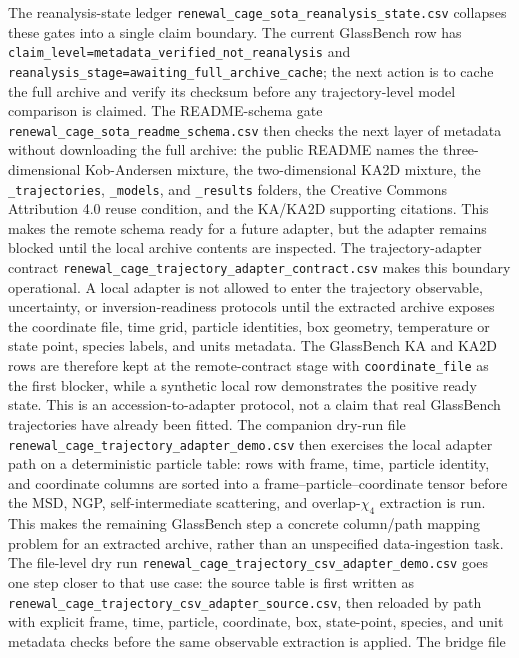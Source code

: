 \documentclass[aps,preprint,onecolumn,superscriptaddress,nofootinbib]{revtex4-2}
\begin{document}
The reanalysis-state ledger
\texttt{renewal\_cage\_sota\_reanalysis\_state.csv} collapses these gates into
a single claim boundary. The current GlassBench row has
\texttt{claim\_level=metadata\_verified\_not\_reanalysis} and
\texttt{reanalysis\_stage=awaiting\_full\_archive\_cache}; the next action is
to cache the full archive and verify its checksum before any trajectory-level
model comparison is claimed.
The README-schema gate
\texttt{renewal\_cage\_sota\_readme\_schema.csv} then checks the next layer of
metadata without downloading the full archive: the public README names the
three-dimensional Kob-Andersen mixture, the two-dimensional KA2D mixture, the
\texttt{\_trajectories}, \texttt{\_models}, and \texttt{\_results} folders,
the Creative Commons Attribution 4.0 reuse condition, and the KA/KA2D
supporting citations. This makes the remote schema ready for a future adapter,
but the adapter remains blocked until the local archive contents are inspected.
The trajectory-adapter contract
\texttt{renewal\_cage\_trajectory\_adapter\_contract.csv} makes this boundary
operational. A local adapter is not allowed to enter the trajectory observable,
uncertainty, or inversion-readiness protocols until the extracted archive
exposes the coordinate file, time grid, particle identities, box geometry,
temperature or state point, species labels, and units metadata. The GlassBench
KA and KA2D rows are therefore kept at the remote-contract stage with
\texttt{coordinate\_file} as the first blocker, while a synthetic local row
demonstrates the positive ready state. This is an accession-to-adapter protocol,
not a claim that real GlassBench trajectories have already been fitted.
The companion dry-run file
\texttt{renewal\_cage\_trajectory\_adapter\_demo.csv} then exercises the local
adapter path on a deterministic particle table: rows with frame, time,
particle identity, and coordinate columns are sorted into a
frame--particle--coordinate tensor before the MSD, NGP, self-intermediate
scattering, and overlap-$\chi_4$ extraction is run. This makes the remaining
GlassBench step a concrete column/path mapping problem for an extracted archive,
rather than an unspecified data-ingestion task.
The file-level dry run
\texttt{renewal\_cage\_trajectory\_csv\_adapter\_demo.csv} goes one step
closer to that use case: the source table is first written as
\texttt{renewal\_cage\_trajectory\_csv\_adapter\_source.csv}, then reloaded by
path with explicit frame, time, particle, coordinate, box, state-point, species,
and unit metadata checks before the same observable extraction is applied.
The bridge file
\end{document}
